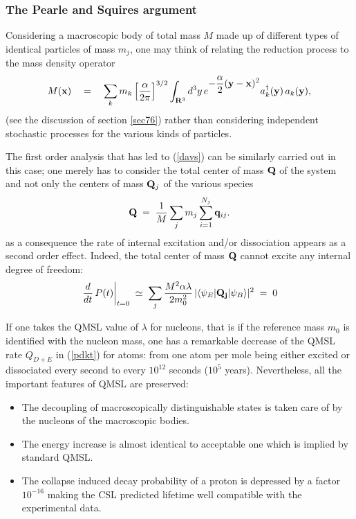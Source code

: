 \documentclass[12pt]{article}
\begin{document}
\subsubsection{The Pearle and Squires argument} \label{sec1532}

Considering a macroscopic body of total mass $M$ made up of
different types of identical particles of mass $m_{j}$, one may
think of relating the reduction process to the mass density
operator
\begin{equation}
M({\bf x}) \quad = \quad \sum_{k} m_{k}
\left[\frac{\alpha}{2\pi}\right]^{3/2} \int_{{\bf R}^{3}} d^{3}y\,
e^{\displaystyle -\frac{\alpha}{2} ({\bf y} - {\bf x})^{2}}
a^{\dagger}_{k}({\bf y})\, a_{k}({\bf y}),
\end{equation}
(see the discussion of section \ref{sec76}) rather than
considering independent stochastic processes for the various
kinds of particles.

The first order analysis that has led to (\ref{davs}) can be
similarly carried out in this case;  one merely  has to consider
the total center  of mass ${\bf Q}$ of the system and not only the
centers of mass ${\bf Q}_{j}$ of the various species
\begin{equation}
{\bf Q} \;  = \; \frac{1}{M} \sum_{j} m_{j} \sum_{i = 1}^{N_{j}}
{\bf q}_{ij}.
\end{equation}
\noindent as a consequence the rate of internal excitation and/or
dissociation appears as a second order effect. Indeed, the total center
of mass ${\bf Q}$ cannot excite any internal degree of freedom:
\begin{equation}
\left. \frac{d}{dt}\, P(t) \right|_{t = 0} \; \simeq \; \sum_{j}
\frac{M^{2}\alpha\lambda}{2m_{0}^{2}}\, |\langle \psi_{E} | {\bf
Q_{j}} | \psi_{B} \rangle |^{2} \; = \; 0
\end{equation}

If one takes the QMSL value of $\lambda$ for nucleons, that is if the
reference mass $m_{0}$ is identified with the nucleon mass, one
has a remarkable decrease of the QMSL rate $Q_{D+E}$ in
(\ref{pdkt}) for atoms: from one atom per mole being either
excited or dissociated every second to  every $10^{12}$ seconds ($10^{5}$
years). Nevertheless, all the important features of QMSL are preserved:
\begin{itemize}
\item The decoupling of macroscopically distinguishable states is
taken care of by the nucleons of the macroscopic bodies.
\item The energy increase is almost identical to  acceptable
one which is implied by standard QMSL.
\item The collapse induced decay probability of a proton is
depressed by a factor $10^{-16}$ making the CSL predicted lifetime
well compatible with the experimental data.
\end{itemize}
\end{document}
